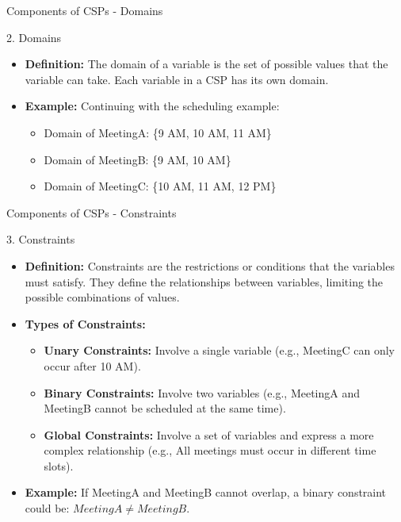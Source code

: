 \documentclass[aspectratio=169]{beamer}
\begin{document}
\begin{frame}[fragile]{Components of CSPs - Domains}
    \begin{block}{2. Domains}
        \begin{itemize}
            \item \textbf{Definition:} The domain of a variable is the set of possible values that the variable can take. Each variable in a CSP has its own domain.
            \item \textbf{Example:} Continuing with the scheduling example:
            \begin{itemize}
                \item Domain of MeetingA: \{9 AM, 10 AM, 11 AM\}
                \item Domain of MeetingB: \{9 AM, 10 AM\}
                \item Domain of MeetingC: \{10 AM, 11 AM, 12 PM\}
            \end{itemize}
        \end{itemize}
    \end{block}
\end{frame}

\begin{frame}[fragile]{Components of CSPs - Constraints}
    \begin{block}{3. Constraints}
        \begin{itemize}
            \item \textbf{Definition:} Constraints are the restrictions or conditions that the variables must satisfy. They define the relationships between variables, limiting the possible combinations of values.
            \item \textbf{Types of Constraints:}
            \begin{itemize}
                \item \textbf{Unary Constraints:} Involve a single variable (e.g., MeetingC can only occur after 10 AM).
                \item \textbf{Binary Constraints:} Involve two variables (e.g., MeetingA and MeetingB cannot be scheduled at the same time).
                \item \textbf{Global Constraints:} Involve a set of variables and express a more complex relationship (e.g., All meetings must occur in different time slots).
            \end{itemize}
            \item \textbf{Example:} If MeetingA and MeetingB cannot overlap, a binary constraint could be: \( MeetingA \neq MeetingB \).
        \end{itemize}
    \end{block}
\end{frame}
\end{document}
